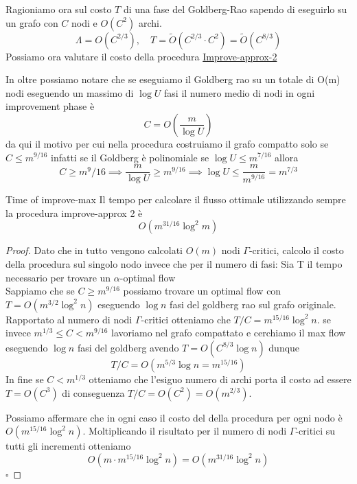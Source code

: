 \documentclass[a4paper, 11pt]{report}
\newcommand*{\QED}{\null\nobreak\hfill\ensuremath{\square}}%
\newcommand{\gmm}{$\Gamma$}
\begin{document}
Ragioniamo ora sul costo $T$ di una fase del Goldberg-Rao sapendo di eseguirlo su un grafo con $C$ nodi e $O(C^2)$ archi.
\[ \Lambda = O(C^{2/3}),\quad T = \tilde O(C^{2/3}\cdot C^2) =\tilde O(C^{8/3})\]
Possiamo ora valutare il costo della procedura \hyperref[imp2]{Improve-approx-2} 

In oltre possiamo notare che se eseguiamo il Goldberg rao su un totale di O(m) nodi eseguendo un massimo di $\log U$ fasi il numero medio di nodi in ogni improvement phase è
\[C = O\left (\frac{m}{\log{U}}\right )\]
da qui il motivo per cui nella procedura costruiamo il grafo compatto solo se $C \le m^{9/16}$ infatti se il Goldberg è polinomiale se $\log U \le m^{7/16}$ allora 
\[C\ge m^9/16 \implies \frac{m}{\log U}\ge m^{9/16} \implies \log U \le \frac{m}{m^{9/16}} = m^{7/3}\]

\begin{lemma}{Time of improve-max}{}
    Il tempo per calcolare il flusso ottimale utilizzando sempre la procedura improve-approx 2 è 
    \[O(m^{31/16}\log^2m)\]
\end{lemma}
\begin{proof}
Dato che in tutto vengono calcolati $O(m)$ nodi \gmm-critici, calcolo il costo della procedura sul singolo nodo invece che per il numero di fasi:
Sia T il tempo necessario per trovare un $\alpha$-optimal flow\\
Sappiamo che se $C \ge m^{9/16}$ possiamo trovare un optimal flow con $T = O(m^{3/2}\log^2 n)$ eseguendo $\log n$ fasi del goldberg rao sul grafo originale. Rapportato al numero di nodi \gmm-critici otteniamo che $T/C = m^{15/16}\log^2n$. 
se invece $ m^{1/3} \le C < m^{9/16}$ lavoriamo nel grafo compattato e cerchiamo il max flow eseguendo $\log n$ fasi del goldberg avendo $T = O(C^{8/3} \log n)$ dunque \[T/C = O(m^{5/3}\log n = m^{15/16})\]
In fine se $C < m^{1/3}$ otteniamo che l'esiguo numero di archi porta il costo ad essere $ T= O(C^3)$ di conseguenza $T/C = O(C^2) = O(m^{2/3})$.

Possiamo affermare che in ogni caso il costo del della procedura per ogni nodo è $O(m^{15/16}\log^2n)$. Moltiplicando il risultato per il numero di nodi \gmm-critici su tutti gli incrementi otteniamo \[O(m\cdot m^{15/16}\log^2n) = O(m^{31/16}\log^2n)\] 
\QED
\end{proof}
\end{document}
